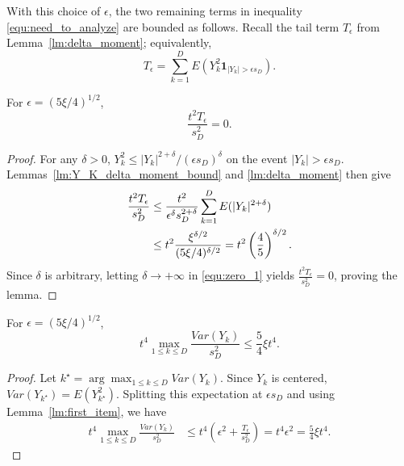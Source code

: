 With this choice of $\epsilon$, the two remaining terms in inequality \ref{equ:need_to_analyze} are bounded as follows. Recall the tail term $T_\epsilon$ from Lemma~\ref{lm:delta_moment}; equivalently,
\begin{equation}
T_\epsilon=\sum_{k=1}^{D}
E(Y_k^2\mathbf{1}_{|Y_k|>\epsilon s_D}) .
\label{equ:tail_term_expectation}
\end{equation}
\begin{lemma}\label{lm:first_item}
For $\epsilon=(5\xi/4)^{1/2}$,
\[
\frac{t^2T_\epsilon}{s_D^2}=0 .
\]
\begin{proof}
For any $\delta>0$, $Y_k^2\leq |Y_k|^{2+\delta}/(\epsilon s_D)^\delta$ on the event $|Y_k|>\epsilon s_D$. Lemmas~\ref{lm:Y_K_delta_moment_bound} and \ref{lm:delta_moment} then give
\begin{align}
\frac{t^2T_\epsilon}{s_D^2}
&\leq
\frac{t^2}{\epsilon^\delta s_D^{2+\delta}}
\sum_{k=1}^{D}E(|Y_k|^{2+\delta}) \notag\\
&\leq
t^2\frac{\xi^{\delta/2}}{(5\xi/4)^{\delta/2}}
=t^2\left(\frac{4}{5}\right)^{\delta/2}.
\label{equ:zero_1}
\end{align}
Since $\delta$ is arbitrary, letting $\delta\to+\infty$ in \eqref{equ:zero_1} yields $\frac{t^2T_\epsilon}{s_D^2}=0$, proving the lemma.
\end{proof}
\end{lemma}

\begin{lemma}\label{lm:sec_term}
For $\epsilon=(5\xi/4)^{1/2}$,
\[
t^4\max_{1\leq k\leq D}\frac{Var(Y_k)}{s_D^2}
\leq \frac{5}{4}\xi t^4 .
\]
\begin{proof}
Let $k^\star=\arg\max_{1\leq k\leq D}Var(Y_k)$. Since $Y_k$ is centered, $Var(Y_{k^\star})=E(Y_{k^\star}^2)$. Splitting this expectation at $\epsilon s_D$ and using Lemma~\ref{lm:first_item}, we have
\begin{align}
t^4\max_{1\leq k\leq D}\frac{Var(Y_k)}{s_D^2}
&\leq t^4\left(\epsilon^2+\frac{T_\epsilon}{s_D^2}\right)
=t^4\epsilon^2
=\frac{5}{4}\xi t^4 .
\label{equ:sec_term}
\end{align}
\end{proof}
\end{lemma}

